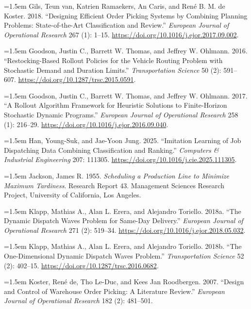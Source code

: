 \documentclass[review,3p,times]{elsarticle}
\newcommand{\citeproctext}{}
\newenvironment{CSLReferences}[2]{%
  \par\addvspace{\baselineskip}%
  \renewcommand{\bibitem}[2][]{\par\addvspace{0.35\baselineskip}\noindent\hangindent=1.5em\hangafter=1}%
}{\par}
\theoremstyle{definition}
\begin{document}
\begin{CSLReferences}{1}{1}
\bibitem[\citeproctext]{ref-vangils2018designing}
Gils, Teun van, Katrien Ramaekers, An Caris, and René B. M. de Koster.
2018. {``Designing Efficient Order Picking Systems by Combining Planning
Problems: State-of-the-Art Classification and Review.''} \emph{European
Journal of Operational Research} 267 (1): 1--15.
\url{https://doi.org/10.1016/j.ejor.2017.09.002}.

\bibitem[\citeproctext]{ref-goodson2016restocking}
Goodson, Justin C., Barrett W. Thomas, and Jeffrey W. Ohlmann. 2016.
{``Restocking-Based Rollout Policies for the Vehicle Routing Problem
with Stochastic Demand and Duration Limits.''} \emph{Transportation
Science} 50 (2): 591--607. \url{https://doi.org/10.1287/trsc.2015.0591}.

\bibitem[\citeproctext]{ref-goodson2017rolloutframework}
Goodson, Justin C., Barrett W. Thomas, and Jeffrey W. Ohlmann. 2017.
{``A Rollout Algorithm Framework for Heuristic Solutions to
Finite-Horizon Stochastic Dynamic Programs.''} \emph{European Journal of
Operational Research} 258 (1): 216--29.
\url{https://doi.org/10.1016/j.ejor.2016.09.040}.

\bibitem[\citeproctext]{ref-hanjung2025imitation}
Han, Young-Suk, and Jae-Yoon Jung. 2025. {``Imitation Learning of Job
Dispatching Data Combining Classification and Ranking.''}
\emph{Computers \& Industrial Engineering} 207: 111305.
\url{https://doi.org/10.1016/j.cie.2025.111305}.

\bibitem[\citeproctext]{ref-jackson1955edd}
Jackson, James R. 1955. \emph{Scheduling a Production Line to Minimize
Maximum Tardiness}. Research Report 43. Management Sciences Research
Project, University of California, Los Angeles.

\bibitem[\citeproctext]{ref-klapp2018dispatchwaves}
Klapp, Mathias A., Alan L. Erera, and Alejandro Toriello. 2018a. {``The
Dynamic Dispatch Waves Problem for Same-Day Delivery.''} \emph{European
Journal of Operational Research} 271 (2): 519--34.
\url{https://doi.org/10.1016/j.ejor.2018.05.032}.

\bibitem[\citeproctext]{ref-klapp2018onedim}
Klapp, Mathias A., Alan L. Erera, and Alejandro Toriello. 2018b. {``The
One-Dimensional Dynamic Dispatch Waves Problem.''} \emph{Transportation
Science} 52 (2): 402--15. \url{https://doi.org/10.1287/trsc.2016.0682}.

\bibitem[\citeproctext]{ref-dekoster2007orderpicking}
Koster, René de, Tho Le-Duc, and Kees Jan Roodbergen. 2007. {``Design
and Control of Warehouse Order Picking: A Literature Review.''}
\emph{European Journal of Operational Research} 182 (2): 481--501.


\end{CSLReferences}
\end{document}
